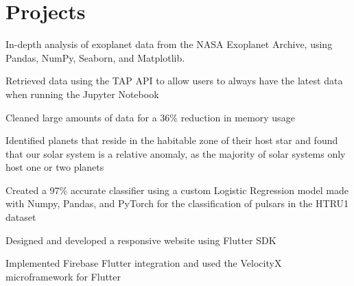 \documentclass[]{resume-template}
\begin{document}
\hfill
\begin{minipage}[t]{0.66\textwidth} 


\section{Projects}\label{sec:projects}
\vspace{\topsep} %
\begin{tightemize}
\item In-depth analysis of exoplanet data from the NASA Exoplanet Archive, using Pandas, NumPy,
Seaborn, and Matplotlib.
\item Retrieved data using the TAP API to allow users to always have the latest data when running the Jupyter Notebook
\item Cleaned large amounts of data for a 36\% reduction in memory usage
\item Identified planets that reside in the habitable zone of their host star and found that our solar system is a
relative anomaly, as the majority of solar systems only host one or two planets
\end{tightemize}

\vspace{\topsep} %
\begin{tightemize}
\item Created a 97\% accurate classifier using a custom Logistic Regression model made with Numpy, Pandas, and PyTorch for the classification of pulsars in the HTRU1 dataset
\end{tightemize}

\begin{tightemize}
\item Designed and developed a responsive website using Flutter SDK
\item Implemented Firebase Flutter integration and used the VelocityX microframework for Flutter
\end{tightemize}



\end{minipage}
\end{document}
